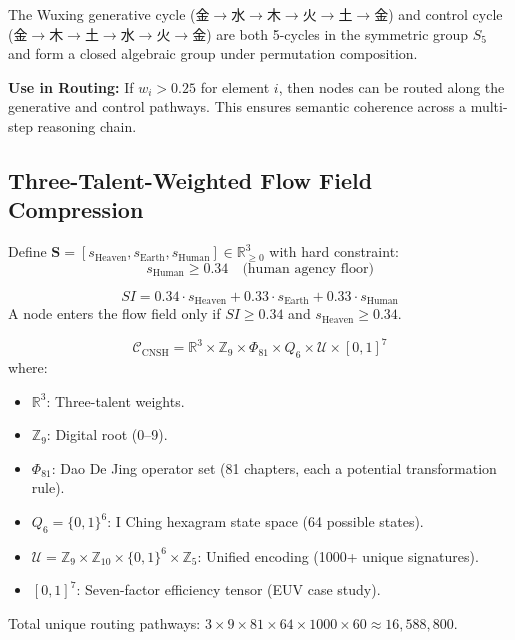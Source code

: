 \documentclass[twocolumn]{article}
\begin{document}
\begin{theorem}
The Wuxing generative cycle ($\text{金} \to \text{水} \to \text{木} \to \text{火} \to \text{土} \to \text{金}$) and control cycle ($\text{金} \to \text{木} \to \text{土} \to \text{水} \to \text{火} \to \text{金}$) are both 5-cycles in the symmetric group $S_5$ and form a closed algebraic group under permutation composition.
\end{theorem}

\textbf{Use in Routing:} If $w_i > 0.25$ for element $i$, then nodes can be routed along the generative and control pathways. This ensures semantic coherence across a multi-step reasoning chain.

\subsection{Three-Talent-Weighted Flow Field Compression}

\begin{definition}
Define $\mathbf{S} = [s_{\text{Heaven}}, s_{\text{Earth}}, s_{\text{Human}}] \in \mathbb{R}^3_{\geq 0}$ with hard constraint:
\[
s_{\text{Human}} \geq 0.34 \quad \text{(human agency floor)}
\]
\end{definition}

\begin{definition}
\[
SI = 0.34 \cdot s_{\text{Heaven}} + 0.33 \cdot s_{\text{Earth}} + 0.33 \cdot s_{\text{Human}}
\]
A node enters the flow field only if $SI \geq 0.34$ and $s_{\text{Heaven}} \geq 0.34$.
\end{definition}

\begin{definition}
\[
\mathcal{C}_{\text{CNSH}} = \mathbb{R}^3 \times \mathbb{Z}_9 \times \Phi_{81} \times Q_6 \times \mathcal{U} \times [0,1]^7
\]
where:
\begin{itemize}
  \item $\mathbb{R}^3$: Three-talent weights.
  \item $\mathbb{Z}_9$: Digital root (0–9).
  \item $\Phi_{81}$: Dao De Jing operator set (81 chapters, each a potential transformation rule).
  \item $Q_6 = \{0,1\}^6$: I Ching hexagram state space (64 possible states).
  \item $\mathcal{U} = \mathbb{Z}_9 \times \mathbb{Z}_{10} \times \{0,1\}^6 \times \mathbb{Z}_5$: Unified encoding (1000+ unique signatures).
  \item $[0,1]^7$: Seven-factor efficiency tensor (EUV case study).
\end{itemize}

Total unique routing pathways: $3 \times 9 \times 81 \times 64 \times 1000 \times 60 \approx 16{,}588{,}800$.
\end{definition}
\end{document}
